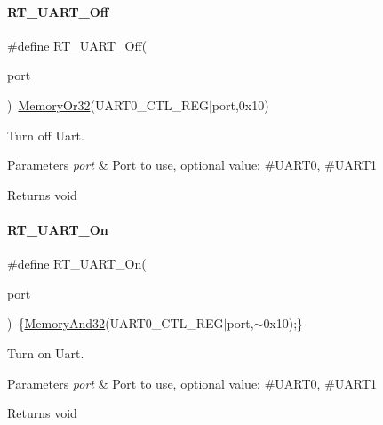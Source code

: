 \paragraph{\texorpdfstring{R\+T\+\_\+\+U\+A\+R\+T\+\_\+\+Off}{RT\_UART\_Off}}
{\footnotesize\ttfamily \#define R\+T\+\_\+\+U\+A\+R\+T\+\_\+\+Off(\begin{DoxyParamCaption}\item[{}]{port }\end{DoxyParamCaption})~\mbox{\hyperlink{a00020_a9ea92ebccdef6bdaca4d00210cc7266d}{Memory\+Or32}}(U\+A\+R\+T0\+\_\+\+C\+T\+L\+\_\+\+R\+EG$\vert$port,0x10)}



Turn off Uart. 


\begin{DoxyParams}{Parameters}
{\em port} & Port to use, optional value\+: \#\+U\+A\+R\+T0, \#\+U\+A\+R\+T1 \\
\hline
\end{DoxyParams}
\begin{DoxyReturn}{Returns}
void 
\end{DoxyReturn}
\mbox{\label{a00056_a7c1428a7b16eec7fe710679dd70b4069}} 
\paragraph{\texorpdfstring{R\+T\+\_\+\+U\+A\+R\+T\+\_\+\+On}{RT\_UART\_On}}
{\footnotesize\ttfamily \#define R\+T\+\_\+\+U\+A\+R\+T\+\_\+\+On(\begin{DoxyParamCaption}\item[{}]{port }\end{DoxyParamCaption})~\{\mbox{\hyperlink{a00020_a5c1a2bd4c1bd4c2f429d8042a45327ff}{Memory\+And32}}(U\+A\+R\+T0\+\_\+\+C\+T\+L\+\_\+\+R\+EG$\vert$port,$\sim$0x10);\}}



Turn on Uart. 


\begin{DoxyParams}{Parameters}
{\em port} & Port to use, optional value\+: \#\+U\+A\+R\+T0, \#\+U\+A\+R\+T1 \\
\hline
\end{DoxyParams}
\begin{DoxyReturn}{Returns}
void 
\end{DoxyReturn}
\mbox{\label{a00056_ad8934a303c429b70176995f2dd6ac67b}} 
